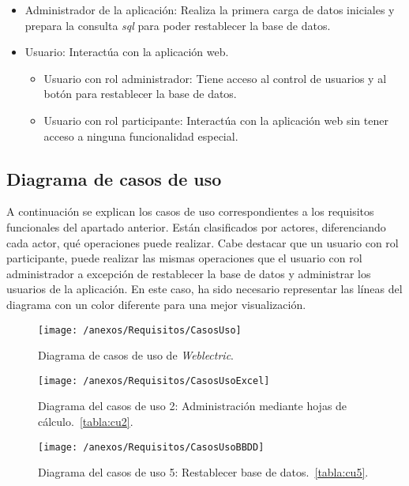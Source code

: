 \begin{itemize}
	\item Administrador de la aplicación: Realiza la primera carga de datos iniciales y prepara la consulta \textit{sql} para poder restablecer la base de datos.
	\item Usuario: Interactúa con la aplicación web.
	\begin{itemize}
		\item Usuario con rol administrador: Tiene acceso al control de usuarios y al botón para restablecer la base de datos.
		\item Usuario con rol participante: Interactúa con la aplicación web sin tener acceso a ninguna funcionalidad especial.
	\end{itemize}
\end{itemize}

\subsection{Diagrama de casos de uso}

A continuación se explican los casos de uso correspondientes a los requisitos funcionales del apartado anterior.
Están clasificados por actores, diferenciando cada actor, qué operaciones puede realizar. Cabe destacar que un usuario con rol participante, puede realizar las mismas operaciones que el usuario con rol administrador a excepción de restablecer la base de datos y administrar los usuarios de la aplicación. En este caso, ha sido necesario representar las líneas del diagrama con un color diferente para una mejor visualización.

\begin{figure}[h]
	\centering
	\texttt{[image: /anexos/Requisitos/CasosUso]}
	\caption{Diagrama de casos de uso de \textit{Weblectric}.}
	\label{fig:casosUso}
\end{figure}

\begin{figure}[h]
	\centering
	\texttt{[image: /anexos/Requisitos/CasosUsoExcel]}
	\caption{Diagrama del casos de uso 2: Administración mediante hojas de cálculo.~\ref{tabla:cu2}.}
	\label{fig:casosUsoExcel}
\end{figure}

\begin{figure}[h]
	\centering
	\texttt{[image: /anexos/Requisitos/CasosUsoBBDD]}
	\caption{Diagrama del casos de uso 5: Restablecer base de datos.~\ref{tabla:cu5}.}
	\label{fig:CasosUsoBBDD}
\end{figure}

